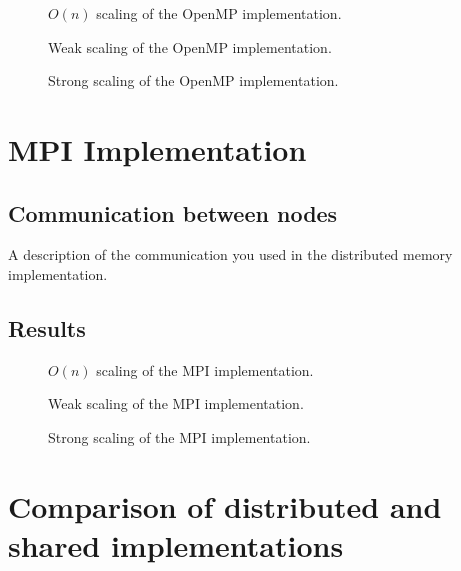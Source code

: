 \documentclass[12pt]{article}
\begin{document}
\begin{figure}
  \caption{$O(n)$ scaling of the OpenMP implementation.}
  \label{fig:openmp-on}
\end{figure}

\begin{figure}
  \caption{Weak scaling of the OpenMP implementation.}
  \label{fig:openmp-weak}
\end{figure}

\begin{figure}
  \caption{Strong scaling of the OpenMP implementation.}
  \label{fig:openmp-strong}
\end{figure}

\section{MPI Implementation}

\subsection{Communication between nodes}
A description of the communication you used in the distributed memory implementation.

\subsection{Results}

\begin{figure}
  \caption{$O(n)$ scaling of the MPI implementation.}
  \label{fig:mpi-on}
\end{figure}

\begin{figure}
  \caption{Weak scaling of the MPI implementation.}
  \label{fig:mpi-weak}
\end{figure}

\begin{figure}
  \caption{Strong scaling of the MPI implementation.}
  \label{fig:mpi-strong}
\end{figure}

\section{Comparison of distributed and shared implementations}
\end{document}
